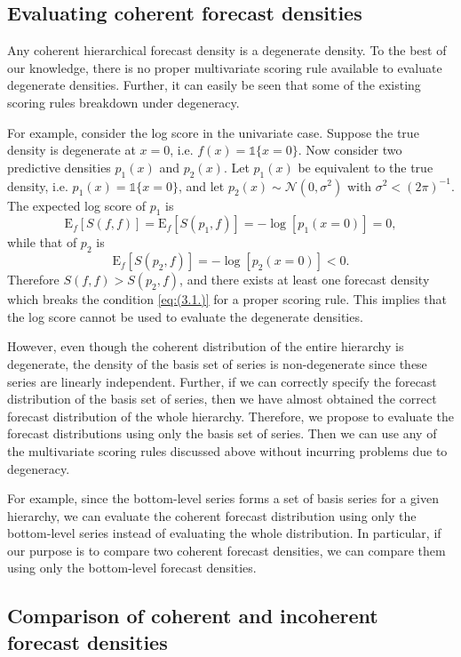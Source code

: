 \documentclass[a4paper, 11pt]{article}
\def\E{\text{E}}
\theoremstyle{theo}
\theoremstyle{definition}
\begin{document}
\subsection{Evaluating coherent forecast densities}

Any coherent hierarchical forecast density is a degenerate density. To the best of our knowledge, there is no proper multivariate scoring rule available to evaluate degenerate densities. Further, it can easily be seen that some of the existing scoring rules breakdown under degeneracy. 

For example, consider the log score in the univariate case. Suppose the true density is degenerate at $x=0$, i.e. $f(x)=\mathbb{1}\{x=0\}$.   Now consider two predictive densities $p_1(x)$ and $p_2(x)$. Let $p_1(x)$ be equivalent to the true density, i.e. $p_1(x)=\mathbb{1}\{x=0\}$, and let $p_2(x) \sim \mathcal{N}(0,\sigma^2)$ with $\sigma^2 < (2\pi)^{-1}$. The expected log score of $p_1$ is
$$
\E_f[S(f,f)] = \E_f[S(p_1,f)] = -\log[p_1(x=0)]=0,
$$
while that of $p_2$ is
$$
\E_f[S(p_2,f)] = -\log[p_2(x=0)]<0.
$$
Therefore $S(f,f) > S(p_2,f)$, and there exists at least one forecast density which breaks the condition \eqref{eq:(3.1.)} for a proper scoring rule. This implies that the log score cannot be used to evaluate the degenerate densities.

However, even though the coherent distribution of the entire hierarchy is degenerate, the density of the basis set of series is non-degenerate since these series are linearly independent. Further, if we can correctly specify the forecast distribution of the basis set of series, then we have almost obtained the correct forecast distribution of the whole hierarchy. Therefore, we propose to evaluate the forecast distributions using only the basis set of series. Then we can use any of the multivariate scoring rules discussed above without incurring problems due to degeneracy.

For example, since the bottom-level series forms a set of basis series for a given hierarchy, we can evaluate the coherent forecast distribution using only the bottom-level series instead of evaluating the whole distribution. In particular, if our purpose is to compare two coherent forecast densities, we can compare them using only the bottom-level forecast densities.

\subsection{Comparison of coherent and incoherent forecast densities}
\end{document}
